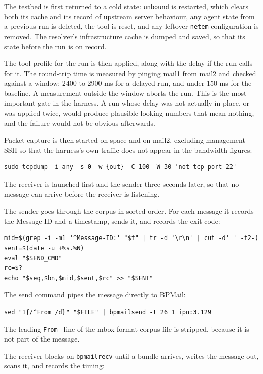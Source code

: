 The testbed is first returned to a cold state: \texttt{unbound} is restarted, which
clears both its cache and its record of upstream server behaviour, any agent state
from a previous run is deleted, the tool is reset, and any leftover \texttt{netem}
configuration is removed. The resolver's infrastructure cache is dumped and saved, so
that its state before the run is on record.

The tool profile for the run is then applied, along with the delay if the run calls for it. The round-trip time is measured by pinging mail1 from mail2 and checked against a window: 2400 to 2900 ms for a delayed run, and under 150 ms for the baseline. A measurement outside the window aborts the run. This is the most important gate in the harness. A run whose delay was not actually in place, or was applied twice, would produce plausible-looking numbers that mean nothing, and the failure would not be obvious afterwards.

Packet capture is then started on space and on mail2, excluding management SSH so
that the harness's own traffic does not appear in the bandwidth figures:

\begin{lstlisting}
sudo tcpdump -i any -s 0 -w {out} -C 100 -W 30 'not tcp port 22'
\end{lstlisting}

The receiver is launched first and the sender three seconds later, so that no message
can arrive before the receiver is listening.

The sender goes through the corpus in sorted order. For each message it records the Message-ID and a timestamp, sends it, and records the exit code:

\begin{lstlisting}
mid=$(grep -i -m1 '^Message-ID:' "$f" | tr -d '\r\n' | cut -d' ' -f2-)
sent=$(date -u +%s.%N)
eval "$SEND_CMD"
rc=$?
echo "$seq,$bn,$mid,$sent,$rc" >> "$SENT"
\end{lstlisting}

The send command pipes the message directly to BPMail:

\begin{lstlisting}
sed "1{/^From /d}" "$FILE" | bpmailsend -t 26 1 ipn:3.129
\end{lstlisting}

The leading \texttt{From } line of the mbox-format corpus file is stripped, because
it is not part of the message.

The receiver blocks on \texttt{bpmailrecv} until a bundle arrives, writes the message
out, scans it, and records the timing:

